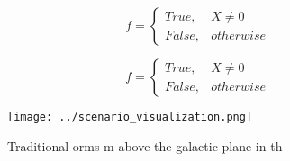 \documentclass[a4paper]{article}
\begin{document}
\begin{equation}   f =
\begin{cases} True, & X \neq 0\\
False, & otherwise
\end{cases}
\end{equation}

\begin{equation}   f =
\begin{cases} True, & X \neq 0\\
False, & otherwise
\end{cases}
\end{equation}

\begin{figure}
\centering
\texttt{[image: ../scenario\_visualization.png]}
\caption{Traditional orms m above the galactic plane in th
}
\end{figure}
 
\end{document}
